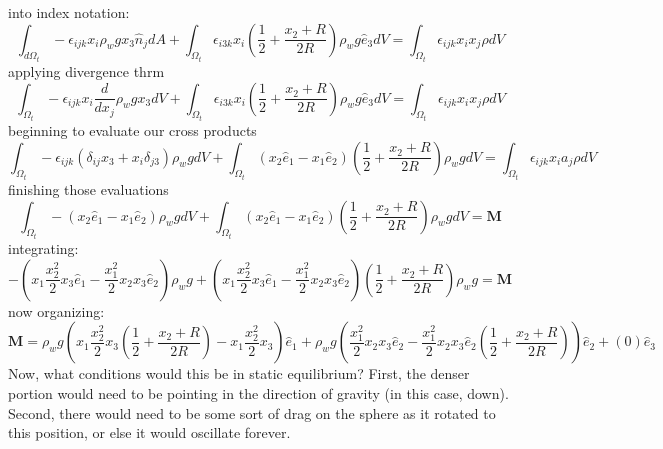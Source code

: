 into index notation:
\begin{equation}
    \int_{d\Omega_t}-\epsilon_{ijk}x_i\rho_w g x_3 \hat{n}_jdA+\int_{\Omega_t}\epsilon_{i3k}x_i(\frac{1}{2}+\frac{x_2+R}{2R})\rho_w g \hat{e}_3dV = \int_{\Omega_t}\epsilon_{ijk}x_ix_j\rho dV
\end{equation}
applying divergence thrm
\begin{equation}
    \int_{\Omega_t}-\epsilon_{ijk}x_i\frac{d}{dx_j}\rho_w g x_3 dV+\int_{\Omega_t}\epsilon_{i3k}x_i(\frac{1}{2}+\frac{x_2+R}{2R})\rho_w g \hat{e}_3dV = \int_{\Omega_t}\epsilon_{ijk}x_ix_j\rho dV
\end{equation}
beginning to evaluate our cross products
\begin{equation}
    \int_{\Omega_t}-\epsilon_{ijk}(\delta_{ij}x_3 +x_i\delta_{j3})\rho_w g  dV+\int_{\Omega_t}(x_2\hat{e}_1-x_1\hat{e}_2)(\frac{1}{2}+\frac{x_2+R}{2R})\rho_w g dV = \int_{\Omega_t}\epsilon_{ijk}x_ia_j\rho dV
\end{equation}
finishing those evaluations
\begin{equation}
    \int_{\Omega_t}-(x_2\hat{e}_1-x_1\hat{e}_2)\rho_w g  dV+\int_{\Omega_t}(x_2\hat{e}_1-x_1\hat{e}_2)(\frac{1}{2}+\frac{x_2+R}{2R})\rho_w g dV = \bm{M}
\end{equation}
integrating:
\begin{equation}
   -(x_1\frac{x_2^2}{2}x_3\hat{e}_1-\frac{x_1^2}{2}x_2x_3\hat{e}_2)\rho_w g  +(x_1\frac{x_2^2}{2}x_3\hat{e}_1-\frac{x_1^2}{2}x_2x_3\hat{e}_2)(\frac{1}{2}+\frac{x_2+R}{2R})\rho_w g = \bm{M}
\end{equation}
now organizing:
\begin{equation}
    \boxed{\bm{M} = \rho_w g(x_1\frac{x_2^2}{2}x_3(\frac{1}{2}+\frac{x_2+R}{2R})-x_1\frac{x_2^2}{2}x_3)\hat{e}_1+\rho_w g(\frac{x_1^2}{2}x_2x_3\hat{e}_2-\frac{x_1^2}{2}x_2x_3\hat{e}_2(\frac{1}{2}+\frac{x_2+R}{2R}))\hat{e}_2+(0)\hat{e}_3}
\end{equation}
Now, what conditions would this be in static equilibrium? First, the denser portion would need to be pointing in the direction of gravity (in this case, down). Second, there would need to be some sort of drag on the sphere as it rotated to this position, or else it would oscillate forever.

\bigskip
